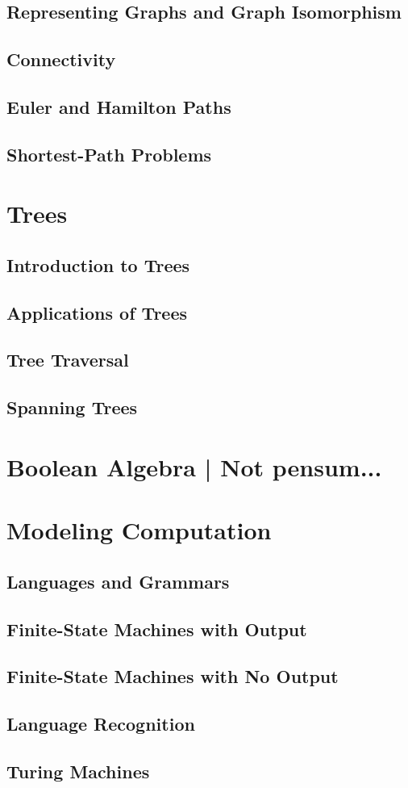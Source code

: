 \documentclass[12pt]{article}
\begin{document}
    \subsection{Representing Graphs and Graph Isomorphism}
    \subsection{Connectivity}
    \subsection{Euler and Hamilton Paths}
    \subsection{Shortest-Path Problems}
    
    \section{Trees}
    \subsection{Introduction to Trees}
    \subsection{Applications of Trees}
    \subsection{Tree Traversal}
    \subsection{Spanning Trees}

    \section{Boolean Algebra | Not pensum...}

    \section{Modeling Computation}
    \subsection{Languages and Grammars}
    \subsection{Finite-State Machines with Output}
    \subsection{Finite-State Machines with No Output}
    \subsection{Language Recognition}
    \subsection{Turing Machines}
\end{document}
